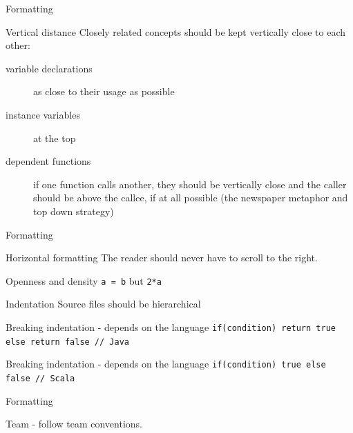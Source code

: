 \begin{frame}{Formatting}
\begin{block}{Vertical distance}
Closely related concepts should be kept vertically close to each other:\\
\begin{description}
\item[variable declarations] as close to their usage as possible
\item[instance variables] at the top
\item[dependent functions] if one function calls another, they should be
vertically close and the caller should be above the callee, if at all possible
(the newspaper metaphor and top down strategy)
\end{description}
\end{block}
\end{frame}

\begin{frame}[fragile]{Formatting}
\begin{block}{Horizontal formatting}
The reader should never have to scroll to the right.
\end{block}
\begin{block}{Openness and density}
\lstinline!a = b! but \lstinline!2*a!
\end{block}
\begin{block}{Indentation}
Source files should be hierarchical
\end{block}
\begin{alertblock}{Breaking indentation - depends on the language}
\lstinline!if(condition) return true else return false // Java!
\end{alertblock}
\begin{exampleblock}{Breaking indentation - depends on the language}
\lstinline!if(condition) true else false // Scala!
\end{exampleblock}
\end{frame}

\begin{frame}{Formatting}
\begin{center}
Team  - follow team conventions.
\end{center}
\end{frame}


